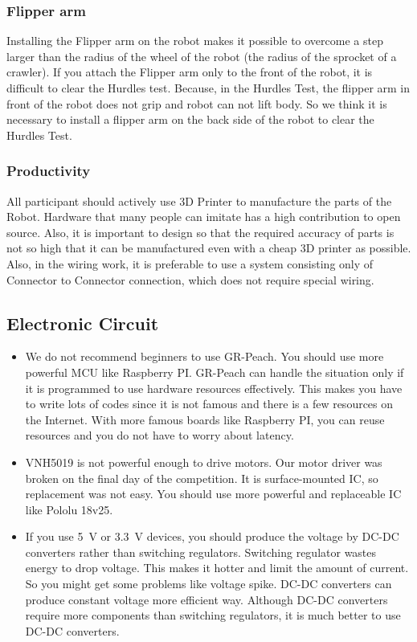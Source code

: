 \documentclass[journal]{IEEEtran}
\begin{document}
\subsubsection{Flipper arm}
Installing the Flipper arm on the robot makes it possible to overcome a step larger than the radius of the wheel of the robot (the radius of the sprocket of a crawler).
If you attach the Flipper arm only to the front of the robot, it is difficult to clear the Hurdles test.
Because, in the Hurdles Test, the flipper arm in front of the robot does not grip and robot can not lift body.
So we think it is necessary to install a flipper arm on the back side of the robot to clear the Hurdles Test.

\subsubsection{Productivity}
All participant should actively use 3D Printer to  manufacture the parts of the Robot.
Hardware that many people can imitate has a high contribution to open source.
Also, it is important to design so that the required accuracy of parts is not so high that it can be manufactured even with a cheap 3D printer as possible.
Also, in the wiring work, it is preferable to use a system consisting only of Connector to Connector connection, which does not require special wiring.

\subsection{Electronic Circuit}
\begin{itemize}
    \item We do not recommend beginners to use GR-Peach.
    You should use more powerful MCU like Raspberry PI.
    GR-Peach can handle the situation only if it is programmed to use hardware resources effectively.
    This makes you have to write lots of codes since it is not famous and there is a few resources on the Internet.
    With more famous boards like Raspberry PI, you can reuse resources and you do not have to worry about latency.
    \item VNH5019 is not powerful enough to drive motors.
    Our motor driver was broken on the final day of the competition.
    It is surface-mounted IC, so replacement was not easy.
    You should use more powerful and replaceable IC like Pololu 18v25.
    \item If you use \SI{5}{\V} or \SI{3.3}{\V} devices, you should produce the voltage by DC-DC converters rather than switching regulators.
    Switching regulator wastes energy to drop voltage.
    This makes it hotter and limit the amount of current.
    So you might get some problems like voltage spike.
    DC-DC converters can produce constant voltage more efficient way.
    Although DC-DC converters require more components than switching regulators, it is much better to use DC-DC converters.
\end{itemize}
\end{document}
